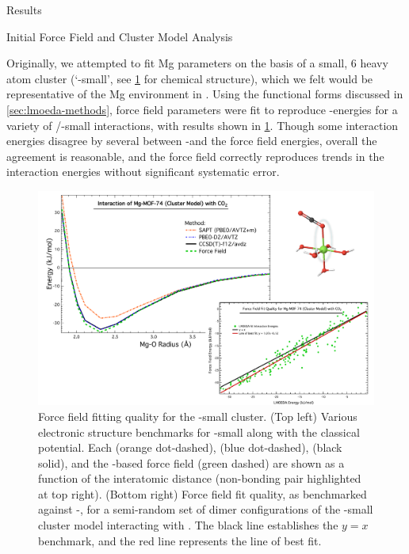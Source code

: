 \begin{section}{Results}
\label{sec:lmoeda-mgmof}

\begin{subsection}{Initial Force Field and Cluster Model Analysis}

Originally, we attempted to fit Mg parameters on the basis of a small, 6 heavy
atom cluster (`\mgmof-small', see \cref{fig:lmoeda-small_fit} for
chemical structure), which we felt would be
representative of the Mg environment in \mgmof. Using the functional forms
discussed in \cref{sec:lmoeda-methods}, force field parameters were fit to
reproduce \lmoeda-\pbeod energies for a variety of \co/\mgmof-small
interactions, with results shown in \cref{fig:lmoeda-small_fit}.
Though some interaction energies disagree by several \kjmol{} between
\lmoeda-\pbeod and the force field energies, overall the agreement is
reasonable, and the force field correctly reproduces trends in the interaction
energies without significant systematic error. 


    \begin{figure}
    \centering
    \includegraphics[width=1.0\textwidth]{lmoeda/small_energies.pdf}
    \caption[Force field fitting quality for the \mgmof-small cluster]
{Force field fitting quality for the \mgmof-small cluster. (Top left) Various
electronic structure benchmarks for \mgmof-small along with the classical
potential. Each \dftsapt (orange dot-dashed), \pbeod (blue dot-dashed), \ccsdtf (black
solid), and the \lmoeda-based force field (green dashed) are shown as a
function of the  interatomic distance (non-bonding pair highlighted
at top right). (Bottom right) Force field fit quality, as benchmarked against
\lmoeda-\pbeod, for a semi-random set of dimer configurations of the
\mgmof-small cluster model interacting with \co. The black line
establishes the $y=x$ benchmark, and the red line represents the line of best
fit.
            }
    \label{fig:lmoeda-small_fit}
    \end{figure}



\end{subsection}
\end{section}
